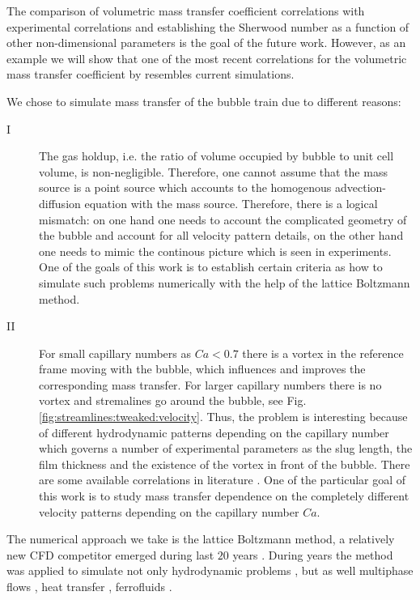 \documentclass{article}
\begin{document}
The comparison of volumetric mass transfer coefficient
correlations with experimental correlations and establishing the Sherwood number as a function of
other non-dimensional parameters is the goal of the future work. However, as an example we will
show that one of the most recent correlations for the volumetric mass transfer coefficient by
\citet{yue-mass} resembles current simulations.

We chose to simulate mass transfer of the bubble train due to different reasons:
\begin{description}
\item[I] The gas holdup, i.e. the ratio of volume occupied by bubble to unit cell volume, is
non-negligible. Therefore, one cannot assume that the mass source is a point source which accounts
to the homogenous advection-diffusion equation with the mass source.  Therefore, there is a logical
mismatch: on one hand one needs to account the complicated geometry of the bubble and account for
all velocity pattern details, on the other hand one needs to mimic the continous picture which is
seen in experiments. One of the goals of this work is to establish certain criteria as how to
simulate such problems numerically with the help of the lattice Boltzmann method.
\item[II] For small capillary numbers as $Ca<0.7$ \cite{giavedoni-numerical} there is a vortex in
the reference frame moving with
the bubble, which  influences and improves the corresponding mass transfer.  For larger capillary
numbers there is no vortex and stremalines go around the bubble, see Fig.
\ref{fig:streamlines:tweaked:velocity}. Thus, the problem is interesting because of different
hydrodynamic patterns depending on the capillary number which governs a number of experimental
parameters as the slug length, the film thickness and the existence of the vortex in front of the
bubble. There are some available
correlations in literature \cite{bercic-mass,kreutzer-overview}. One of the particular goal of
this work is to study mass transfer dependence on the completely different velocity patterns
depending on the capillary number $Ca$. 
\end{description}
 
The numerical approach we take is the lattice Boltzmann method, a relatively new CFD
competitor emerged during last $20$ years \cite{frisch,mcnamara,HJ,HSB}. During years the
method was applied to simulate not only hydrodynamic problems \cite{yu}, but as well multiphase
flows \cite{Shan-chen:extended,swift,gunstensen}, heat transfer
\cite{yuan-thermal,zhang-thermal}, ferrofluids \cite{dellar-ferro,kuzmin-aniso}.
\end{document}
